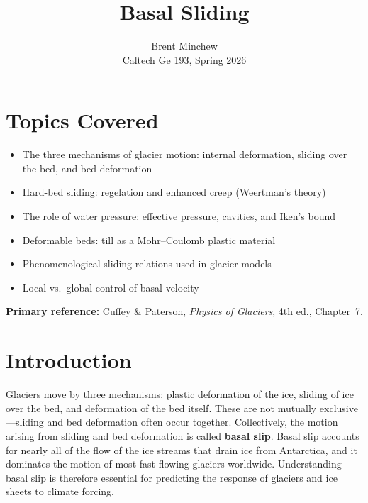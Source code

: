 \documentclass[11pt]{article}
\title{Basal Sliding}
\author{Brent Minchew \\Caltech Ge 193, Spring 2026}
\date{}
\begin{document}
\maketitle

\section*{Topics Covered}

\begin{itemize}
  \item The three mechanisms of glacier motion: internal deformation, sliding over the bed, and bed deformation
  \item Hard-bed sliding: regelation and enhanced creep (Weertman's theory)
  \item The role of water pressure: effective pressure, cavities, and Iken's bound
  \item Deformable beds: till as a Mohr--Coulomb plastic material
  \item Phenomenological sliding relations used in glacier models
  \item Local vs.\ global control of basal velocity
\end{itemize}

\noindent\textbf{Primary reference:} Cuffey \& Paterson, \textit{Physics of Glaciers}, 4th ed., Chapter~7.

\section{Introduction}
\label{sec:intro}

Glaciers move by three mechanisms: plastic deformation of the ice, sliding of ice over the bed, and deformation of the bed itself.  These are not mutually exclusive---sliding and bed deformation often occur together.  Collectively, the motion arising from sliding and bed deformation is called \textbf{basal slip}.  Basal slip accounts for nearly all of the flow of the ice streams that drain ice from Antarctica, and it dominates the motion of most fast-flowing glaciers worldwide.  Understanding basal slip is therefore essential for predicting the response of glaciers and ice sheets to climate forcing.
\end{document}
